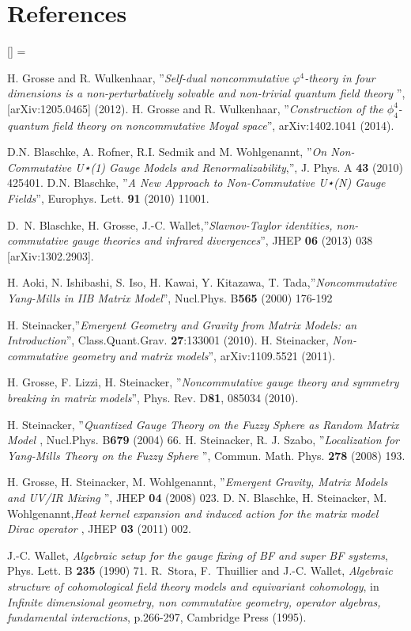 \documentclass[a4paper,11pt,twoside]{article}
\numberwithin{equation}{section}
\theoremstyle{nonumberplain}
\newcounter{and}
\renewenvironment{thebibliography}[1]{%
\section*{References}%
\frenchspacing\small%
\begin{list}{[\arabic{enumi}]}%
{%
\usecounter{enumi}\parsep=2pt\topsep 0pt%
\settowidth{\labelwidth}{[#1]}%
\leftmargin=\labelwidth\advance\leftmargin\labelsep%
\rightmargin=0pt\itemsep=1pt\sloppy%
}%
}{\end{list}}
\begin{document}
\begin{thebibliography}{50}
 H. Grosse and R. Wulkenhaar, ''{\it{Self-dual noncommutative $\varphi^4$-theory in four dimensions is a non-perturbatively solvable and non-trivial quantum field theory}} '', [arXiv:1205.0465] (2012). H. Grosse and R. Wulkenhaar, ''{\it{Construction of the $\phi^4_4$-quantum field theory on noncommutative Moyal space}}'', arXiv:1402.1041 (2014).

 D.N. Blaschke, A. Rofner, R.I. Sedmik and M. Wohlgenannt, ''{\it{On Non-Commutative U⋆(1)
Gauge Models and Renormalizability}},'', J. Phys. A {\bf{43}} (2010) 425401. D.N. Blaschke, ''{\it{A New Approach to Non-Commutative U⋆(N) Gauge Fields}}'',
Europhys. Lett. {\bf{91}} (2010) 11001.

 D.~N. Blaschke, H. Grosse, J.-C. Wallet,''{\it{Slavnov-Taylor identities, non-commutative gauge theories and infrared divergences}}'', JHEP {\bf{06}} (2013) 038 [arXiv:1302.2903].

 H. Aoki, N. Ishibashi, S. Iso, H. Kawai, Y. Kitazawa, T. Tada,''{\it{Noncommutative Yang-Mills in IIB Matrix Model}}'', Nucl.Phys. B{\bf{565}} (2000) 176-192 

 H. Steinacker,''{\it{Emergent Geometry and Gravity from Matrix Models: an Introduction}}'', Class.Quant.Grav. {\bf{27}}:133001 (2010). H. Steinacker, {\it{Non-commutative geometry and matrix models}}'', arXiv:1109.5521 (2011).

 H. Grosse, F. Lizzi, H. Steinacker, ''{\it{Noncommutative gauge theory and symmetry breaking in matrix models}}'', Phys. Rev. D{\bf{81}}, 085034 (2010).

  H. Steinacker, ''{\it{Quantized Gauge Theory on the Fuzzy Sphere as Random Matrix Model }}, Nucl.Phys. B{\bf{679}} (2004) 66. H. Steinacker, R. J. Szabo, ''{\it{Localization for Yang-Mills Theory on the Fuzzy Sphere }}'', Commun. Math. Phys. {\bf{278}} (2008) 193.

 H. Grosse, H. Steinacker, M. Wohlgenannt, ''{\it{Emergent Gravity, Matrix Models and UV/IR Mixing }}'', JHEP {\bf{04}} (2008) 023. D. N. Blaschke, H. Steinacker, M. Wohlgenannt,{\it{Heat kernel expansion and induced action for the matrix model Dirac operator }}, JHEP {\bf{03}} (2011) 002.

 J.-C. Wallet, \textit{Algebraic setup for the gauge fixing of {BF} and super
  {BF} systems}, Phys. Lett. B {\bf{235}} (1990) 71. 
R.~Stora, F.~Thuillier and J.-C. Wallet, \textit{{Algebraic structure of
  cohomological field theory models and equivariant cohomology}}, {in
  \textit{Infinite dimensional geometry, non commutative geometry, operator
  algebras, fundamental interactions}, p.266-297, Cambridge Press (1995)}.


\end{thebibliography}
\end{document}
